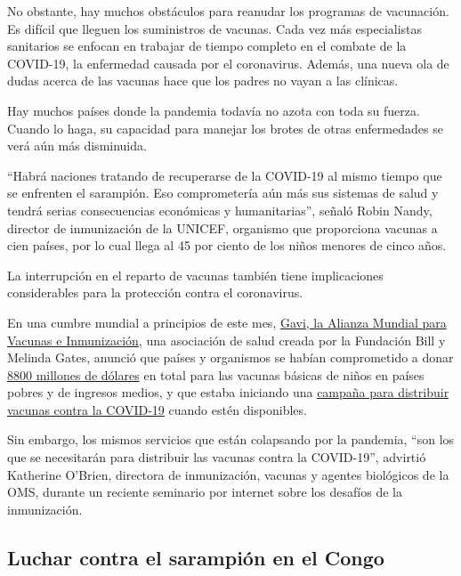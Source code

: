 No obstante, hay muchos obstáculos para reanudar los programas de
vacunación. Es difícil que lleguen los suministros de vacunas. Cada vez
más especialistas sanitarios se enfocan en trabajar de tiempo completo
en el combate de la COVID-19, la enfermedad causada por el coronavirus.
Además, una nueva ola de dudas acerca de las vacunas hace que los padres
no vayan a las clínicas.

Hay muchos países donde la pandemia todavía no azota con toda su fuerza.
Cuando lo haga, su capacidad para manejar los brotes de otras
enfermedades se verá aún más disminuida.

``Habrá naciones tratando de recuperarse de la COVID-19 al mismo tiempo
que se enfrenten el sarampión. Eso comprometería aún más sus sistemas de
salud y tendrá serias consecuencias económicas y humanitarias'', señaló
Robin Nandy, director de inmunización de la UNICEF, organismo que
proporciona vacunas a cien países, por lo cual llega al 45 por ciento de
los niños menores de cinco años.

La interrupción en el reparto de vacunas también tiene implicaciones
considerables para la protección contra el coronavirus.

En una cumbre mundial a principios de este mes,
\href{https://www.gavi.org/our-alliance}{Gavi, la Alianza Mundial para
Vacunas e Inmunización}, una asociación de salud creada por la Fundación
Bill y Melinda Gates, anunció que países y organismos se habían
comprometido a donar
\href{https://www.gavi.org/news/media-room/world-leaders-make-historic-commitments-provide-equal-access-vaccines-all}{8800
millones de dólares} en total para las vacunas básicas de niños en
países pobres y de ingresos medios, y que estaba iniciando una
\href{https://www.gavi.org/news/media-room/gavi-launches-innovative-financing-mechanism-access-covid-19-vaccines}{campaña
para distribuir vacunas contra la COVID-19} cuando estén disponibles.

Sin embargo, los mismos servicios que están colapsando por la pandemia,
``son los que se necesitarán para distribuir las vacunas contra la
COVID-19'', advirtió Katherine O'Brien, directora de inmunización,
vacunas y agentes biológicos de la OMS, durante un reciente seminario
por internet sobre los desafíos de la inmunización.

\hypertarget{luchar-contra-el-sarampiuxf3n-en-el-congo}{%
\subsection{Luchar contra el sarampión en el
Congo}\label{luchar-contra-el-sarampiuxf3n-en-el-congo}}


